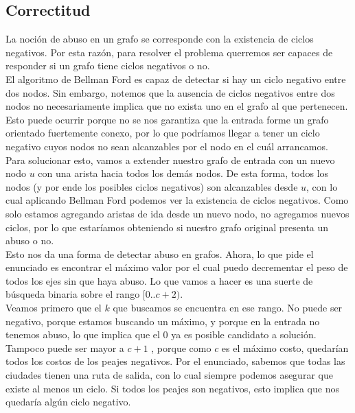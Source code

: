 \subsection{Correctitud}

La noción de abuso en un grafo se corresponde con la existencia de ciclos negativos. Por esta razón, para resolver el problema querremos ser capaces de responder si un grafo tiene ciclos negativos o no. \\

El algoritmo de Bellman Ford es capaz de detectar si hay un ciclo negativo entre dos nodos. Sin embargo, notemos que la ausencia de ciclos negativos entre dos nodos no necesariamente implica que no exista uno en el grafo al que pertenecen. Esto puede ocurrir porque no se nos garantiza que la entrada forme un grafo orientado fuertemente conexo, por lo que podríamos llegar a tener un ciclo negativo cuyos nodos no sean alcanzables por el nodo en el cuál arrancamos. \\

Para solucionar esto, vamos a extender nuestro grafo de entrada con un nuevo nodo $u$ con una arista hacia todos los demás nodos. De esta forma, todos los nodos (y por ende los posibles ciclos negativos) son alcanzables desde $u$, con lo cual aplicando Bellman Ford podemos ver la existencia de ciclos negativos. Como solo estamos agregando aristas de ida desde un nuevo nodo, no agregamos nuevos ciclos, por lo que estaríamos obteniendo si nuestro grafo original presenta un abuso o no. \\

Esto nos da una forma de detectar abuso en grafos. Ahora, lo que pide el enunciado es encontrar el máximo valor por el cual puedo decrementar el peso de todos los ejes sin que haya abuso. Lo que vamos a hacer es una suerte de búsqueda binaria sobre el rango $[0..c+2)$. \\

Veamos primero que el $k$ que buscamos se encuentra en ese rango. No puede ser negativo, porque estamos buscando un máximo, y porque en la entrada no tenemos abuso, lo que implica que el $0$ ya es posible candidato a solución. Tampoco puede ser mayor a $c+1$ , porque como $c$ es el máximo costo, quedarían todos los costos de los peajes negativos. Por el enunciado, sabemos que todas las ciudades tienen una ruta de salida, con lo cual siempre podemos asegurar que existe al menos un ciclo. Si todos los peajes son negativos, esto implica que nos quedaría algún ciclo negativo. \\

